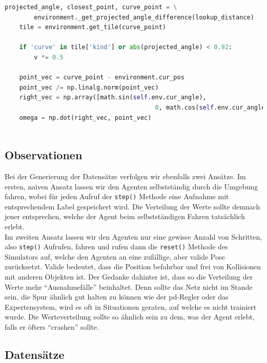 \begin{minipage}{\linewidth}
	\begin{lstlisting}[caption={Berechnung eines Steuerbefehls mit einfachem Expertensystem}, language=python]
	projected_angle, closest_point, curve_point = \
		environment._get_projected_angle_difference(lookup_distance)
	tile = environment.get_tile(curve_point)
	
	if 'curve' in tile['kind'] or abs(projected_angle) < 0.92:
		v *= 0.5
	
	point_vec = curve_point - environment.cur_pos
	point_vec /= np.linalg.norm(point_vec)
	right_vec = np.array([math.sin(self.env.cur_angle), 
									     0, math.cos(self.env.cur_angle)])
	omega = np.dot(right_vec, point_vec)
	
	\end{lstlisting}
\end{minipage}

\subsection{Observationen}

Bei der Generierung der Datensätze verfolgen wir ebenfalls zwei Ansätze. Im ersten, naiven Ansatz lassen wir den Agenten selbstständig durch die Umgebung fahren, wobei für jeden Aufruf der \texttt{step()} Methode eine Aufnahme mit entsprechendem Label gespeichert wird. Die Verteilung der Werte sollte demnach jener entsprechen, welche der Agent beim selbstständigen Fahren tatsächlich erlebt. \\

Im zweiten Ansatz lassen wir den Agenten nur eine gewisse Anzahl von Schritten, also \texttt{step()} Aufrufen, fahren und rufen dann die \texttt{reset()} Methode des Simulators auf, welche den Agenten an eine zufällige, aber valide Pose zurücksetzt. Valide bedeutet, dass die Position befahrbar und frei von Kollisionen mit anderen Objekten ist.
Der Gedanke dahinter ist, dass so die Verteilung der Werte mehr ``Ausnahmefälle'' beinhaltet. Denn sollte das Netz nicht im Stande sein, die Spur ähnlich gut halten zu können wie der \acs{pd}-Regler oder das Expertensystem, wird es oft in Situationen geraten, auf welche es nicht trainiert wurde. Die Werteverteilung sollte so ähnlich sein zu dem, was der Agent erlebt, falls er öfters ``crashen'' sollte.

\subsection{Datensätze}

